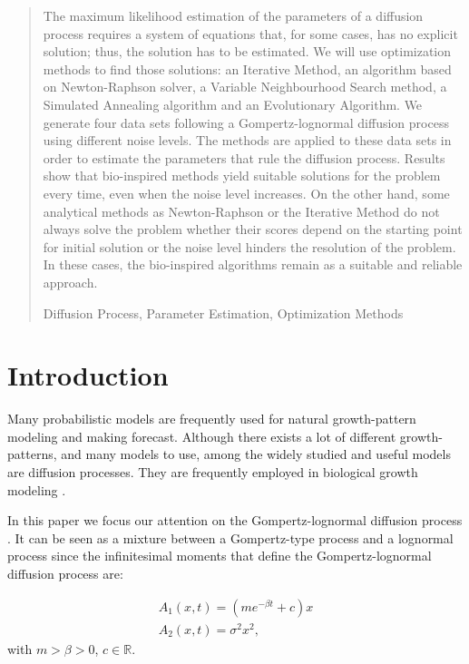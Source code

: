 \documentclass{sig-alternate}
\newcommand{\keywords}[1]{\par\addvspace\baselineskip
\noindent\keywordname\enspace\ignorespaces#1}
\begin{document}
\maketitle


\begin{abstract}
The maximum likelihood estimation of the parameters of a diffusion
process requires a system of equations that, for some cases, has no
explicit solution; thus, the solution has to be estimated. We will use
optimization methods to find those solutions: an Iterative Method, an
algorithm based on Newton-Raphson solver, a Variable Neighbourhood
Search method, a Simulated Annealing algorithm and an Evolutionary
Algorithm. We generate four data sets following a Gompertz-lognormal
diffusion process using different noise levels. The methods are applied
to these data sets in order to estimate the parameters that rule
the diffusion process. Results show that bio-inspired methods
yield suitable solutions for the problem every time, even when the
noise level increases. On the other hand, some analytical methods as
Newton-Raphson or the Iterative Method do not always solve the
problem whether their scores depend on the starting point for initial
solution or the noise level hinders the resolution of the problem. In
these cases, the bio-inspired algorithms remain as a suitable and
reliable approach. 

\keywords{Diffusion Process, Parameter Estimation, Optimization Methods}
\end{abstract}

\section{Introduction}

Many probabilistic models are frequently used for natural growth-pattern modeling and making forecast. Although there exists a lot of different growth-patterns, and many models to use, among the widely studied and useful models are diffusion processes. They are frequently employed in biological growth modeling \cite{lognormal}.

In this paper we focus our attention on the Gompertz-lognormal diffusion process \cite{proceedingBol}. It can be seen as a mixture between a Gompertz-type process \cite{Gut07b} and a lognormal process \cite{GutCy} since the infinitesimal moments that define the Gompertz-lognormal diffusion process are:

\[
\begin{array}{l}
A_1(x,t)=(m e^{-\beta t}+c)x \\
A_2(x,t)=\sigma^2 x^2,
\end{array}
\]
with $m > \beta > 0$, $c\in \mathbb{R}$.
\end{document}
